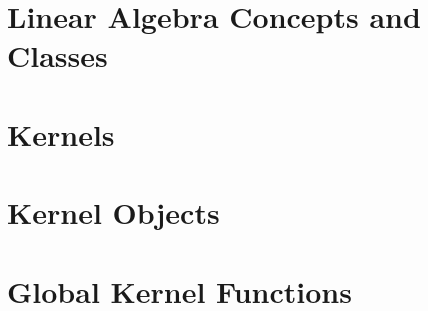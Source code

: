 


\lcTex{}

\clearpage
\section{Linear Algebra Concepts and Classes}
\gdef\ccRefPageBreak{\ccFalse}

\gdef\ccRefPageBreak{\ccTrue}





\clearpage
\section{Kernels}
\gdef\ccRefPageBreak{\ccFalse}


\gdef\ccRefPageBreak{\ccTrue}

\gdef\ccRefPageBreak{\ccTrue}


\clearpage
\section{Kernel Objects}
\gdef\ccRefPageBreak{\ccFalse}


\gdef\ccRefPageBreak{\ccTrue}












\clearpage
\section{Global Kernel Functions}
\gdef\ccRefPageBreak{\ccFalse}


\gdef\ccRefPageBreak{\ccTrue}





















